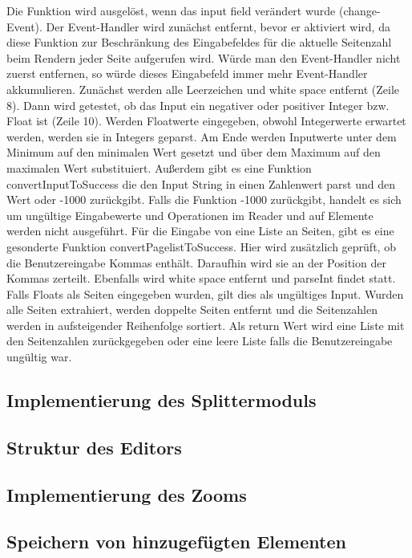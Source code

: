 Die Funktion wird ausgelöst, wenn das input field verändert wurde (change-Event). Der Event-Handler wird zunächst entfernt, bevor er aktiviert wird, da diese Funktion zur Beschränkung des Eingabefeldes für die aktuelle Seitenzahl beim Rendern jeder Seite aufgerufen wird. Würde man den Event-Handler nicht zuerst entfernen, so würde dieses Eingabefeld immer mehr Event-Handler akkumulieren. Zunächst werden alle Leerzeichen und white space entfernt (Zeile 8). Dann wird getestet, ob das Input ein negativer oder positiver Integer bzw. Float ist (Zeile 10). Werden Floatwerte eingegeben, obwohl Integerwerte erwartet werden, werden sie in Integers geparst. Am Ende werden Inputwerte unter dem Minimum auf den minimalen Wert gesetzt und über dem Maximum auf den maximalen Wert substituiert. Außerdem gibt es eine Funktion convertInputToSuccess die den Input String in einen Zahlenwert parst und den Wert oder -1000 zurückgibt. Falls die Funktion -1000 zurückgibt, handelt es sich um ungültige Eingabewerte und Operationen im Reader und auf Elemente werden nicht ausgeführt. Für die Eingabe von eine Liste an Seiten, gibt es eine gesonderte Funktion convertPagelistToSuccess. Hier wird zusätzlich geprüft, ob die Benutzereingabe Kommas enthält. Daraufhin wird sie an der Position der Kommas zerteilt. Ebenfalls wird white space entfernt und parseInt findet statt. Falls Floats als Seiten eingegeben wurden, gilt dies als ungültiges Input. Wurden alle Seiten extrahiert, werden doppelte Seiten entfernt und die Seitenzahlen werden in aufsteigender Reihenfolge sortiert. Als return Wert wird eine Liste mit den Seitenzahlen zurückgegeben oder eine leere Liste falls die Benutzereingabe ungültig war.

\subsection{Implementierung des Splittermoduls}

\subsection{Struktur des Editors}

\subsection{Implementierung des Zooms}

\subsection{Speichern von hinzugefügten Elementen}